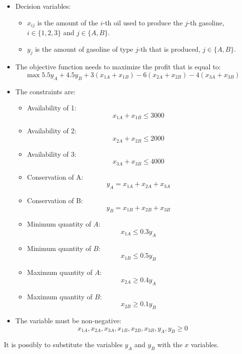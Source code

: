 \documentclass[12pt, a4paper]{report}
\newtheorem[style=M,bodystyle=\normalfont]{theorem}{Theorem}
\newtheorem[style=M,bodystyle=\normalfont]{corollary}{Corollary}
\newtheorem[style=M,bodystyle=\normalfont]{lemma}{Lemma}
\newtheorem[style=M,bodystyle=\normalfont]{definition}{Definition}
\begin{document}
\begin{Answer}[ref=2]
    \begin{itemize}
        \item Decision variables:
            \begin{itemize}
                \item $x_{ij}$ is the amount of the $i$-th oil used to produce the $j$-th gasoline, $i \in \{1,2,3\}$ and $j \in \{A,B\}$. 
                \item $y_j$ is the amount of gasoline of type $j$-th that is produced, $j \in \{A,B\}$. 
            \end{itemize}
        \item The objective function needs to maximize the profit that is equal to: 
            \[\max{5.5y_A+4.5y_B+3(x_{1A}+x_{1B})-6(x_{2A}+x_{2B})-4(x_{3A}+x_{3B})}\]
        \item The constraints are: 
            \begin{itemize}
                \item Availability of 1: 
                    \[x_{1A}+x_{1B} \leq 3 000\]
                \item Availability of 2:
                    \[x_{2A}+x_{2B} \leq 2 000\]
                \item Availability of 3:  
                    \[x_{3A}+x_{3B} \leq 4 000\]
                \item Conservation of A:
                    \[y_A=x_{1A}+x_{2A}+x_{3A}\]
                \item Conservation of B:
                    \[y_B=x_{1B}+x_{2B}+x_{3B}\]
                \item Minimum quantity of $A$: 
                    \[x_{1A} \leq 0.3y_A\]
                \item Minimum quantity of $B$: 
                    \[x_{1B} \leq 0.5y_B\]
                \item Maximum quantity of $A$: 
                    \[x_{2A} \geq 0.4y_A\]
                \item Maximum quantity of $B$: 
                    \[x_{2B} \geq 0.1y_B\]
            \end{itemize}
        \item The variable must be non-negative:
            \[x_{1A},x_{2A},x_{3A},x_{1B},x_{2B},x_{3B},y_A,y_B \geq 0\]  
    \end{itemize}
    It is possibly to substitute the variables $y_A$ and $y_B$ with the $x$ variables. 
\end{Answer}
\end{document}
